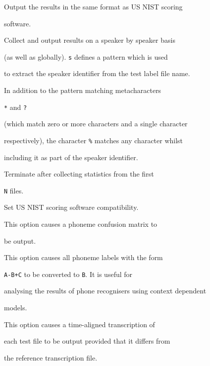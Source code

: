 \begin{optlist}
   Output the results in the same format as US NIST scoring 


      software.





   Collect and output results on a speaker by speaker basis


      (as well as globally).  \texttt{s} defines a pattern which is used 


      to extract the speaker identifier from the test label file name.


      In addition to the pattern matching metacharacters 


      \texttt{*} and \texttt{?}


      (which match zero or more characters and a single character 


      respectively), the character \texttt{\%} matches any character whilst


      including it as part of the speaker identifier.





   Terminate after collecting statistics from the first


      \texttt{N} files.  





   Set US NIST scoring software compatibility.


      


   This option causes a phoneme confusion matrix to


      be output.





   This option causes all phoneme labels with the form


      {\tt A-B+C} to be converted to {\tt B}.  It is useful for


      analysing the results of phone recognisers using context dependent


      models.





   This option causes a time-aligned transcription of


      each test file to be output provided that it differs from


      the reference transcription file.






\end{optlist}

